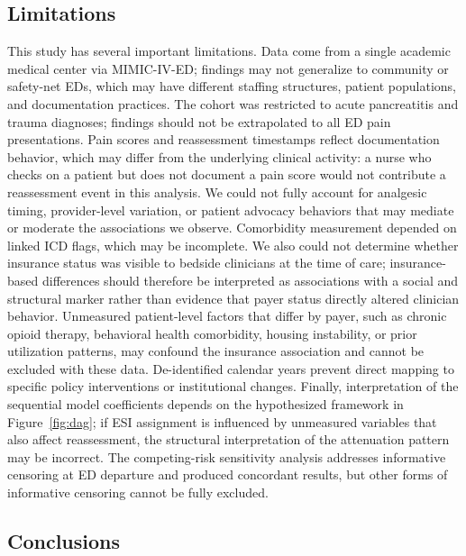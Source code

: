 \documentclass[11pt]{article}
\begin{document}
\subsection{Limitations}

This study has several important limitations.
Data come from a single academic medical center via MIMIC-IV-ED; findings may not generalize to community or safety-net EDs, which may have different staffing structures, patient populations, and documentation practices.
The cohort was restricted to acute pancreatitis and trauma diagnoses; findings should not be extrapolated to all ED pain presentations.
Pain scores and reassessment timestamps reflect documentation behavior, which may differ from the underlying clinical activity: a nurse who checks on a patient but does not document a pain score would not contribute a reassessment event in this analysis.
We could not fully account for analgesic timing, provider-level variation, or patient advocacy behaviors that may mediate or moderate the associations we observe.
Comorbidity measurement depended on linked ICD flags, which may be incomplete.
We also could not determine whether insurance status was visible to bedside clinicians at the time of care; insurance-based differences should therefore be interpreted as associations with a social and structural marker rather than evidence that payer status directly altered clinician behavior.
Unmeasured patient-level factors that differ by payer, such as chronic opioid therapy, behavioral health comorbidity, housing instability, or prior utilization patterns, may confound the insurance association and cannot be excluded with these data.
De-identified calendar years prevent direct mapping to specific policy interventions or institutional changes.
Finally, interpretation of the sequential model coefficients depends on the hypothesized framework in Figure~\ref{fig:dag}; if ESI assignment is influenced by unmeasured variables that also affect reassessment, the structural interpretation of the attenuation pattern may be incorrect.
The competing-risk sensitivity analysis addresses informative censoring at ED departure and produced concordant results, but other forms of informative censoring cannot be fully excluded.

\subsection{Conclusions}
\end{document}

